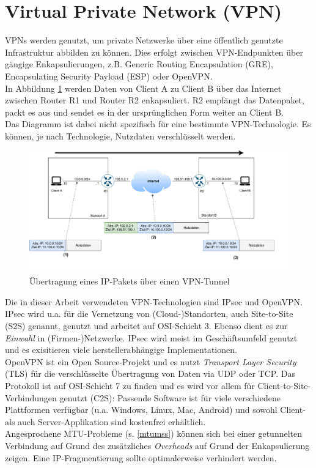 \section{Virtual Private Network (VPN)}\label{vpn}
VPNs werden genutzt, um private Netzwerke über eine öffentlich genutzte Infrastruktur abbilden zu können. Dies erfolgt zwischen VPN-Endpunkten über gängige Enkapsulierungen, z.B. Generic Routing Encapsulation (GRE), Encapsulating Security Payload (ESP) oder OpenVPN.\\
In Abbildung \ref{grafik: vpn-example} werden Daten von Client A zu Client B über das Internet zwischen Router R1 und Router R2 enkapsuliert. R2 empfängt das Datenpaket, packt es aus und sendet es in der ursprünglichen Form weiter an Client B.\\
Das Diagramm ist dabei nicht spezifisch für eine bestimmte VPN-Technologie. Es können, je nach Technologie, Nutzdaten verschlüsselt werden. 
\begin{figure}[h]
  \centering
  \includegraphics[scale=0.65]{Figures/vpn-example.pdf}
  \caption{Übertragung eines IP-Pakets über einen VPN-Tunnel}
  \label{grafik: vpn-example}
\end{figure}\FloatBarrier

Die in dieser Arbeit verwendeten VPN-Technologien sind IPsec und OpenVPN. IPsec wird u.a. für die Vernetzung von (Cloud-)Standorten, auch Site-to-Site (S2S) genannt, genutzt und arbeitet auf OSI-Schicht 3. Ebenso dient es zur \textit{Einwahl} in (Firmen-)Netzwerke. IPsec wird meist im Geschäftsumfeld genutzt und es exisitieren viele herstellerabhängige Implementationen.\\
OpenVPN ist ein Open Source-Projekt und es nutzt \textit{Transport Layer Security} (TLS) für die verschlüsselte Übertragung von Daten via UDP oder TCP. Das Protokoll ist auf OSI-Schicht 7 zu finden und es wird vor allem für Client-to-Site-Verbindungen genutzt (C2S): Passende Software ist für viele verschiedene Plattformen verfügbar (u.a. Windows, Linux, Mac, Android) und sowohl Client- als auch Server-Applikation sind kostenfrei erhältlich.\\
Angesprochene MTU-Probleme (s. \ref{mtumss}) können sich bei einer getunnelten Verbindung auf Grund des zusätzliches \textit{Overheads} auf Grund der Enkapsulierung zeigen. Eine IP-Fragmentierung sollte optimalerweise verhindert werden.

